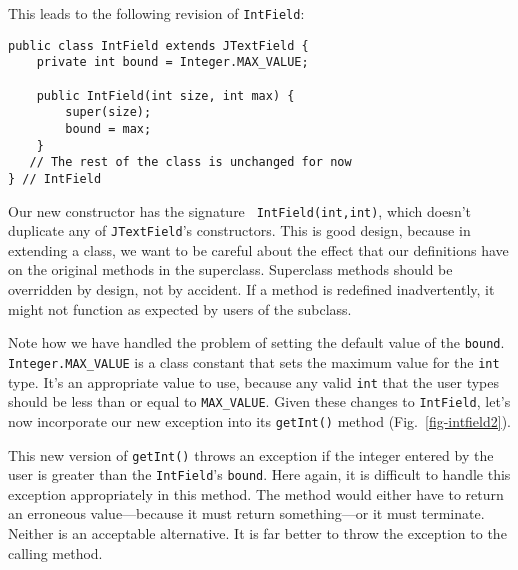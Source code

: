 This leads to the following revision of {\tt IntField}:

\begin{jjjlisting}
\begin{lstlisting}
public class IntField extends JTextField {
    private int bound = Integer.MAX_VALUE;

    public IntField(int size, int max) {
        super(size);
        bound = max;
    }
   // The rest of the class is unchanged for now
} // IntField
\end{lstlisting}
\end{jjjlisting}

\noindent Our new constructor has the signature {\tt
IntField(int,int)}, which doesn't duplicate any of {\tt JTextField}'s
constructors.  This is good design, because in extending a class, we want to be
careful about the effect that our definitions have on the original
methods in the superclass.  Superclass methods should be overridden by
design, not by accident.  If a method
is redefined inadvertently, it might not function as expected by users
of the subclass.


Note how we have handled the problem of setting the default value of
the {\tt bound}. {\tt Integer.MAX\_VALUE} is a class constant that
sets the maximum value for the {\tt int} type.  It's an appropriate
value to use, because any valid {\tt int} that the user types should
be less than or equal to {\tt MAX\_VALUE}.  Given these changes to
{\tt IntField}, let's now incorporate our new exception into its
{\tt getInt()} method (Fig.~\ref{fig-intfield2}).


This new version of {\tt getInt()} throws an exception if the integer
entered by the user is greater than the {\tt IntField}'s
{\tt bound}. Here again, it is difficult to handle this exception
appropriately in this method.  The method would either have to return
an erroneous value---because it must return something---or it must
terminate.  Neither is an acceptable alternative.  It is far better to
throw the exception to the calling method.


